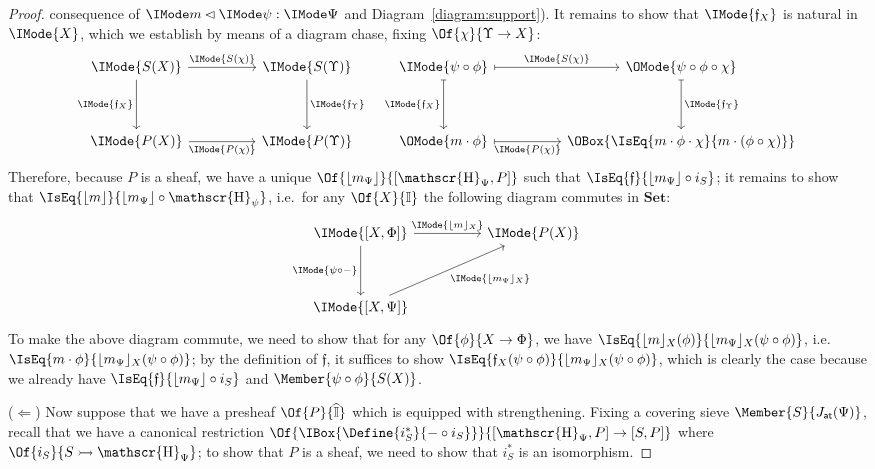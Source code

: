 \documentclass{article}
\newcommand\Sets{\mathbf{Set}}
\DeclareMathOperator\OpYoneda{\mathscr{H}}
\newcommand\Yoneda[1]{\OpYoneda_{#1}}
\newcommand\Psh[1]{\widehat{#1}}
\newcommand\JAtomic{J_{\mathsf{at}}}
\newcommand\Emb[1]{\lfloor{#1}\rfloor}
\begin{document}
\begin{proof}
  consequence of $\Supports{\Psi}{\psi}{m}$ and
  Diagram~\ref{diagram:support}).
%
  It remains to show that $\IMode{\mathfrak{f}_X}$ is natural in
  $\IMode{X}$, which we establish by means of a diagram chase, fixing
  $\Of{\chi}{\Upsilon\to X}$:
  \[
    \begin{tikzcd}[sep=huge]
      \IMode{S(X)}
      \arrow[r,"\IMode{S(\chi)}"]
      \arrow[d,swap,"\IMode{\mathfrak{f}_X}"]
      &
      \IMode{S(\Upsilon)}
      \arrow[d,"\IMode{\mathfrak{f}_\Upsilon}"]
      \\
      \IMode{P(X)}
      \arrow[r,swap,"\IMode{P(\chi)}"]
      &
      \IMode{P(\Upsilon)}
    \end{tikzcd}
    \quad
    \begin{tikzcd}[sep=huge]
      \IMode{\psi\circ\phi}
      \arrow[r,mapsto,"\IMode{S(\chi)}"]
      \arrow[d,mapsto,swap,"\IMode{\mathfrak{f}_X}"]
      &
      \OMode{\psi\circ\phi\circ\chi}
      \arrow[d,mapsto,"\IMode{\mathfrak{f}_\Upsilon}"]
      \\
      \OMode{m\cdot\phi}
      \arrow[r,swap,mapsto,"\IMode{P(\chi)}"]
      &
      \OBox{\IsEq{m\cdot\phi\cdot\chi}{m\cdot(\phi\circ\chi)}}
    \end{tikzcd}
  \]
  Therefore, because $P$ is a sheaf, we have a unique
  $\Of{\Emb{m_\Psi}}{[\Yoneda{\Psi},P]}$ such that
  $\IsEq{\mathfrak{f}}{\Emb{m_\Psi}\circ i_S}$; it remains to show that
  $\IsEq{\Emb{m}}{\Emb{m_\Psi}\circ\Yoneda{\psi}}$, i.e.\ for any
  $\Of{X}{\CatI}$ the following diagram commutes in $\Sets$:
  \[
    \begin{tikzcd}[sep=huge]
      \IMode{[X,\Phi]}
      \arrow[r,"\IMode{\Emb{m}_X}"]
      \arrow[d,swap,"\IMode{\psi\circ-}"]
      &
      \IMode{P(X)}
      \\
      \IMode{[X,\Psi]}
      \arrow[ur,swap,"\IMode{\Emb{m_\Psi}_X}"]
    \end{tikzcd}
  \]
  To make the above diagram commute, we need to show that for any
  $\Of{\phi}{X\to\Phi}$, we have
  $\IsEq{\Emb{m}_X(\phi)}{\Emb{m_\Psi}_X(\psi\circ\phi)}$,
  i.e. $\IsEq{m\cdot\phi}{\Emb{m_\Psi}_X(\psi\circ\phi)}$; by the
  definition of $\mathfrak{f}$, it suffices to show
  $\IsEq{\mathfrak{f}_X(\psi\circ\phi)}{\Emb{m_\Psi}_X(\psi\circ\phi)}$,
  which is clearly the case because we already have
  $\IsEq{\mathfrak{f}}{\Emb{m_\Psi}\circ i_S}$ and
  $\Member{\psi\circ\phi}{S(X)}$.

  ($\Leftarrow$) Now suppose that we have a presheaf
  $\Of{P}{\Psh{\CatI}}$ which is equipped with strengthening. Fixing a
  covering sieve $\Member{S}{\JAtomic(\Psi)}$, recall that we have a
  canonical restriction
  $\Of{\IBox{\Define{i_S^*}{-\circ i_S}}}{[\Yoneda{\Psi},P]\to[S,P]}$
  where $\Of{i_S}{\Mono{S}{\Yoneda{\Psi}}}$; to show that $P$ is a
  sheaf, we need to show that $i_S^*$ is an isomorphism.


\end{proof}
\end{document}
